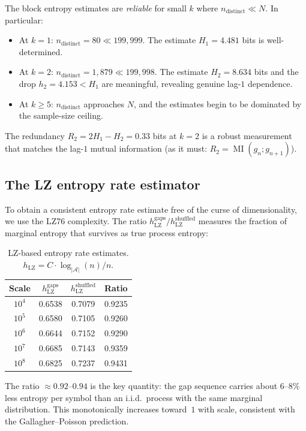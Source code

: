 \documentclass[11pt, a4paper]{amsart}
\theoremstyle{plain}
\theoremstyle{definition}
\newcommand{\MI}{\operatorname{MI}}
\begin{document}
The block entropy estimates are \emph{reliable} for small $k$ where $n_{\text{distinct}} \ll N$. In particular:
\begin{itemize}
\item At $k = 1$: $n_{\text{distinct}} = 80 \ll 199{,}999$. The estimate $H_1 = 4.481$ bits is well-determined.
\item At $k = 2$: $n_{\text{distinct}} = 1{,}879 \ll 199{,}998$. The estimate $H_2 = 8.634$ bits and the drop $h_2 = 4.153 < H_1$ are meaningful, revealing genuine lag-$1$ dependence.
\item At $k \ge 5$: $n_{\text{distinct}}$ approaches $N$, and the estimates begin to be dominated by the sample-size ceiling.
\end{itemize}

The redundancy $R_2 = 2 H_1 - H_2 = 0.33$ bits at $k = 2$ is a robust measurement that matches the lag-$1$ mutual information (as it must: $R_2 = \MI(g_n; g_{n+1})$).


\subsection{The LZ entropy rate estimator}

To obtain a consistent entropy rate estimate free of the curse of dimensionality, we use the LZ76 complexity.
The ratio $h_{\mathrm{LZ}}^{\mathrm{gaps}} / h_{\mathrm{LZ}}^{\mathrm{shuffled}}$ measures the fraction of marginal entropy that survives as true process entropy:

\begin{table}[ht]
\centering
\caption{LZ-based entropy rate estimates. $h_{\mathrm{LZ}} = C \cdot \log_{|\mathcal{A}|}(n) / n$.}
\label{tab:lz-rate}
\begin{tabular}{cccc}
\toprule
Scale & $h_{\mathrm{LZ}}^{\mathrm{gaps}}$ & $h_{\mathrm{LZ}}^{\mathrm{shuffled}}$ & Ratio \\
\midrule
$10^4$ & 0.6538 & 0.7079 & 0.9235 \\
$10^5$ & 0.6580 & 0.7105 & 0.9260 \\
$10^6$ & 0.6644 & 0.7152 & 0.9290 \\
$10^7$ & 0.6685 & 0.7143 & 0.9359 \\
$10^8$ & 0.6825 & 0.7237 & 0.9431 \\
\bottomrule
\end{tabular}
\end{table}

The ratio $\approx 0.92$--$0.94$ is the key quantity: the gap sequence carries about $6$--$8\%$ less entropy per symbol than an i.i.d.\ process with the same marginal distribution. This monotonically increases toward~$1$ with scale, consistent with the Gallagher--Poisson prediction.
\end{document}
